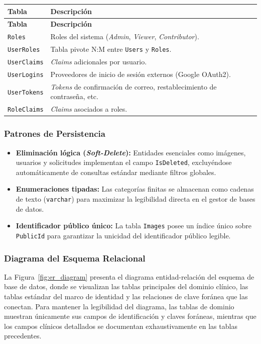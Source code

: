 \begin{longtable}{|p{3cm}|p{11.5cm}|}
\hline
\textbf{Tabla} & \textbf{Descripción} \\
\hline
\endfirsthead
\hline
\textbf{Tabla} & \textbf{Descripción} \\
\hline
\endhead
\texttt{Roles} & Roles del sistema (\textit{Admin}, \textit{Viewer}, \textit{Contributor}). \\
\hline
\texttt{UserRoles} & Tabla pivote N:M entre \texttt{Users} y \texttt{Roles}. \\
\hline
\texttt{UserClaims} & \textit{Claims} adicionales por usuario. \\
\hline
\texttt{UserLogins} & Proveedores de inicio de sesión externos (Google OAuth2). \\
\hline
\texttt{UserTokens} & \textit{Tokens} de confirmación de correo, restablecimiento de contraseña, etc. \\
\hline
\texttt{RoleClaims} & \textit{Claims} asociados a roles. \\
\hline
\end{longtable}


\subsubsection{Patrones de Persistencia}
\begin{itemize}
    \item \textbf{Eliminación lógica (\textit{Soft-Delete}):} Entidades esenciales como imágenes, usuarios y solicitudes implementan el campo \texttt{IsDeleted}, excluyéndose automáticamente de consultas estándar mediante filtros globales.
    \item \textbf{Enumeraciones tipadas:} Las categorías finitas se almacenan como cadenas de texto (\texttt{varchar}) para maximizar la legibilidad directa en el gestor de bases de datos.
    \item \textbf{Identificador público único:} La tabla \texttt{Images} posee un índice único sobre \texttt{PublicId} para garantizar la unicidad del identificador público legible.
\end{itemize}

\subsubsection{Diagrama del Esquema Relacional}

La Figura~\ref{fig:er_diagram} presenta el diagrama entidad-relación del esquema de base de datos, donde se visualizan las tablas principales del dominio clínico, las tablas estándar del marco de identidad y las relaciones de clave foránea que las conectan. Para mantener la legibilidad del diagrama, las tablas de dominio muestran únicamente sus campos de identificación y claves foráneas, mientras que los campos clínicos detallados se documentan exhaustivamente en las tablas precedentes.

